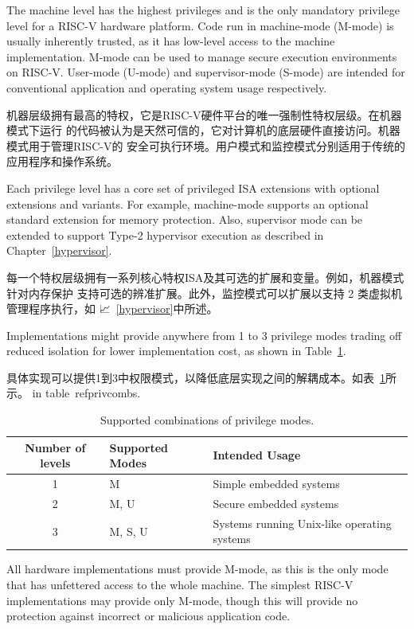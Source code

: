 The machine level has the highest privileges and is the only mandatory
privilege level for a RISC-V hardware platform.  Code run in
machine-mode (M-mode) is usually inherently trusted, as it has
low-level access to the machine implementation.  M-mode can be used to
manage secure execution environments on RISC-V.  User-mode (U-mode)
and supervisor-mode (S-mode) are intended for conventional application
and operating system usage respectively.

机器层级拥有最高的特权，它是RISC-V硬件平台的唯一强制性特权层级。在机器模式下运行
的代码被认为是天然可信的，它对计算机的底层硬件直接访问。机器模式用于管理RISC-V的
安全可执行环境。用户模式和监控模式分别适用于传统的应用程序和操作系统。

Each privilege level has a core set of privileged ISA extensions with optional
extensions and variants.  For example, machine-mode supports an optional
standard extension for memory protection.  Also, supervisor mode can be
extended to support Type-2 hypervisor execution as described in
Chapter~\ref{hypervisor}.

每一个特权层级拥有一系列核心特权ISA及其可选的扩展和变量。例如，机器模式针对内存保护
支持可选的辨准扩展。此外，监控模式可以扩展以支持 2 类虚拟机管理程序执行，如
📈~\ref{hypervisor}中所述。


Implementations might provide anywhere from 1 to 3 privilege modes
trading off reduced isolation for lower implementation cost, as shown
in Table~\ref{privcombs}.

具体实现可以提供1到3中权限模式，以降低底层实现之间的解耦成本。如表~\ref{privcombs}所示。
in table~ref{privcombs}.


\begin{table}[h!]
\begin{center}
\begin{tabular}{|c|l|l|}
  \hline
   Number of levels &  Supported Modes & Intended Usage \\ \hline  
   1     & M          & Simple embedded systems \\ 
   2     & M, U       & Secure embedded systems \\ 
   3     & M, S, U    & Systems running Unix-like operating systems\\ 
  \hline
 \end{tabular}
\end{center}
\caption{Supported combinations of privilege modes.}
\label{privcombs}
\end{table}

All hardware implementations must provide M-mode, as this is the only
mode that has unfettered access to the whole machine.  The simplest
RISC-V implementations may provide only M-mode, though this will
provide no protection against incorrect or malicious application code.

